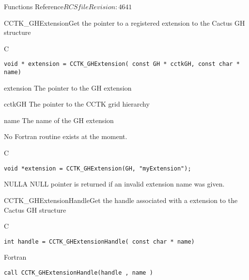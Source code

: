 \begin{cactuspart}{ Functions Reference}{$RCSfile$}{$Revision: 4641 $}
\begin{FunctionDescription}{CCTK\_GHExtension}{Get the pointer to a registered extension to the Cactus GH structure}
\label{CCTK-GHExtension}
\begin{SynopsisSection}
\begin{Synopsis}{C}
\begin{verbatim}void * extension = CCTK_GHExtension( const GH * cctkGH, const char * name)\end{verbatim}
\end{Synopsis}
\end{SynopsisSection}
\begin{ParameterSection}
\begin{Parameter}{extension}
The pointer to the GH extension
\end{Parameter}
\begin{Parameter}{cctkGH}
The pointer to the CCTK grid hierarchy
\end{Parameter}
\begin{Parameter}{name}
The name of the GH extension
\end{Parameter}
\end{ParameterSection}
\begin{Discussion}
No Fortran routine exists at the moment.
\end{Discussion}
\begin{ExampleSection}
\begin{Example}{C}
\begin{verbatim}
void *extension = CCTK_GHExtension(GH, "myExtension");
\end{verbatim}
\end{Example}
\end{ExampleSection}
\begin{ErrorSection}
\begin{Error}{NULL}A NULL pointer is returned if an invalid extension name was given.\end{Error}
\end{ErrorSection}
\end{FunctionDescription}

\begin{FunctionDescription}{CCTK\_GHExtensionHandle}{Get the handle associated with a extension to the Cactus GH structure}
\label{CCTK-GHExtensionHandle}
\begin{SynopsisSection}
\begin{Synopsis}{C}
\begin{verbatim}int handle = CCTK_GHExtensionHandle( const char * name)\end{verbatim}
\end{Synopsis}
\begin{Synopsis}{Fortran}
\begin{verbatim}call CCTK_GHExtensionHandle(handle , name )


\end{verbatim}
\end{Synopsis}
\end{SynopsisSection}
\end{FunctionDescription}
\end{cactuspart}
